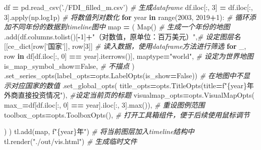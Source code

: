 \documentclass[]{ctexart}
\newenvironment{Shaded}{\begin{snugshade}}{\end{snugshade}}
\newcommand{\BuiltInTok}[1]{#1}
\newcommand{\CommentTok}[1]{\textcolor[rgb]{0.56,0.35,0.01}{\textit{#1}}}
\newcommand{\ControlFlowTok}[1]{\textcolor[rgb]{0.13,0.29,0.53}{\textbf{#1}}}
\newcommand{\DecValTok}[1]{\textcolor[rgb]{0.00,0.00,0.81}{#1}}
\newcommand{\KeywordTok}[1]{\textcolor[rgb]{0.13,0.29,0.53}{\textbf{#1}}}
\newcommand{\NormalTok}[1]{#1}
\newcommand{\OperatorTok}[1]{\textcolor[rgb]{0.81,0.36,0.00}{\textbf{#1}}}
\newcommand{\SpecialCharTok}[1]{\textcolor[rgb]{0.00,0.00,0.00}{#1}}
\newcommand{\SpecialStringTok}[1]{\textcolor[rgb]{0.31,0.60,0.02}{#1}}
\newcommand{\StringTok}[1]{\textcolor[rgb]{0.31,0.60,0.02}{#1}}
\newcommand{\VariableTok}[1]{\textcolor[rgb]{0.00,0.00,0.00}{#1}}
\begin{document}
\begin{Shaded}
\begin{Highlighting}[]
\NormalTok{df }\OperatorTok{=}\NormalTok{ pd.read_csv(}\StringTok{'./FDI_filled_m.csv'}\NormalTok{)                }\CommentTok{# 生成dataframe}
\NormalTok{df.iloc[:, }\DecValTok{3}\NormalTok{] }\OperatorTok{=}\NormalTok{ df.iloc[:, }\DecValTok{3}\NormalTok{].}\BuiltInTok{apply}\NormalTok{(np.log1p)         }\CommentTok{# 将数值列对数化}
\ControlFlowTok{for}\NormalTok{ year }\KeywordTok{in} \BuiltInTok{range}\NormalTok{(}\DecValTok{2003}\NormalTok{, }\DecValTok{2019}\OperatorTok{+}\DecValTok{1}\NormalTok{):                      }\CommentTok{# 循环添加不同年份的数据到timeline图中}
    \BuiltInTok{map} \OperatorTok{=}\NormalTok{ (}
\NormalTok{        Map()                                         }\CommentTok{# 生成一个年份的地图}
\NormalTok{        .add(df.columns.tolist()[}\OperatorTok{-}\DecValTok{1}\NormalTok{]}\OperatorTok{+}\StringTok{"（对数值，原单位：百万美元）"}\NormalTok{,}\CommentTok{# 设定图层名}
\NormalTok{             [[ce_dict[row[}\StringTok{'国家'}\NormalTok{]], row[}\DecValTok{3}\NormalTok{]]          }\CommentTok{# 读入数据，使用dataframe方法进行筛选}
                 \ControlFlowTok{for}\NormalTok{ _, row }\KeywordTok{in}\NormalTok{ df[df.iloc[:, }\DecValTok{0}\NormalTok{] }\OperatorTok{==}\NormalTok{ year].iterrows()],}
\NormalTok{             maptype}\OperatorTok{=}\StringTok{"world"}\NormalTok{,                         }\CommentTok{# 设定为世界地图}
\NormalTok{             is_map_symbol_show}\OperatorTok{=}\VariableTok{False}\NormalTok{,                }\CommentTok{# 不描点}
\NormalTok{             )}
\NormalTok{        .set_series_opts(label_opts}\OperatorTok{=}\NormalTok{opts.LabelOpts(is_show}\OperatorTok{=}\VariableTok{False}\NormalTok{)) }\CommentTok{# 在地图中不显示对应国家的数值}
\NormalTok{        .set_global_opts(}
\NormalTok{            title_opts}\OperatorTok{=}\NormalTok{opts.TitleOpts(title}\OperatorTok{=}\SpecialStringTok{f"}\SpecialCharTok{\{}\NormalTok{year}\SpecialCharTok{\}}\SpecialStringTok{年外商直接投资情况"}\NormalTok{), }\CommentTok{#设定当前页的标题}
\NormalTok{            visualmap_opts}\OperatorTok{=}\NormalTok{opts.VisualMapOpts(}
\NormalTok{                max_}\OperatorTok{=}\NormalTok{df[df.iloc[:, }\DecValTok{0}\NormalTok{] }\OperatorTok{==}\NormalTok{ year].iloc[:, }\DecValTok{3}\NormalTok{].}\BuiltInTok{max}\NormalTok{()),    }\CommentTok{# 重设图例范围}
\NormalTok{            toolbox_opts}\OperatorTok{=}\NormalTok{opts.ToolboxOpts(),                         }\CommentTok{# 打开工具箱组件，便于后续使用鼠标调节}

\NormalTok{        )}
\NormalTok{    )}
\NormalTok{    tl.add(}\BuiltInTok{map}\NormalTok{, }\SpecialStringTok{f"}\SpecialCharTok{\{}\NormalTok{year}\SpecialCharTok{\}}\SpecialStringTok{年"}\NormalTok{) }\CommentTok{# 将当前图层加入timeline结构中}
\NormalTok{tl.render(}\StringTok{"./out/vis.html"}\NormalTok{) }\CommentTok{# 生成临时文件}
\end{Highlighting}
\end{Shaded}
\end{document}
